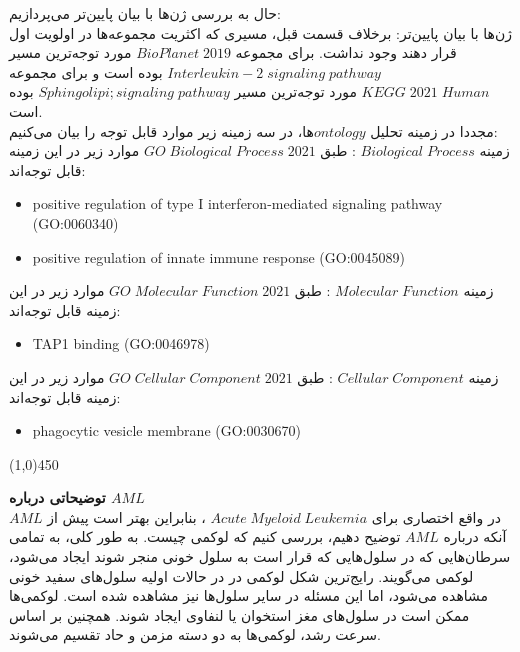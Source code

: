 \documentclass[a4paper,12pt]{article}
\begin{document}
حال به بررسی ژن‌ها با بیان پایین‌تر می‌پردازیم:\\
ژن‌ها با بیان پایین‌تر: برخلاف قسمت قبل، مسیری که اکثریت مجموعه‌ها در اولویت اول قرار دهند وجود نداشت. برای مجموعه
$BioPlanet\; 2019$
مورد توجه‌ترین مسیر
$Interleukin-2\; signaling\; pathway$
بوده است و برای مجموعه
$KEGG\; 2021\; Human$
مورد توجه‌ترین مسیر
$Sphingolipi; signaling\; pathway$
بوده است.
\\
مجددا در زمینه تحلیل $ontology$ها، در سه زمینه زیر موارد قابل توجه را بیان می‌کنیم:\\
زمینه
$Biological\; Process$ : 
طبق
$GO\; Biological\; Process\; 2021$
موارد زیر در این زمینه قابل توجه‌اند:
\begin{latin}
\begin{itemize}
\item positive regulation of type I interferon-mediated signaling pathway (GO:0060340)
\item positive regulation of innate immune response (GO:0045089)
\end{itemize}
\end{latin}
زمینه
$Molecular\; Function$ : 
طبق
$GO\; Molecular\; Function\; 2021$
موارد زیر در این زمینه قابل توجه‌اند:
\begin{latin}
\begin{itemize}
\item TAP1 binding (GO:0046978)
\end{itemize}
\end{latin}
زمینه
$Cellular\; Component$ : 
طبق
$GO\; Cellular\; Component\; 2021$
موارد زیر در این زمینه قابل توجه‌اند:
\begin{latin}
\begin{itemize}
\item phagocytic vesicle membrane (GO:0030670)
\end{itemize}
\end{latin}
\begin{center}
\line(1,0){450}
\end{center}
\textbf{توضیحاتی درباره $AML$}\\
$AML$
در واقع اختصاری برای
$Acute\; Myeloid\; Leukemia$
،
بنابراین بهتر است پیش از آنکه درباره $AML$ توضیح دهیم، بررسی کنیم که لوکمی چیست. به طور کلی، به تمامی سرطان‌هایی که در سلول‌هایی که قرار است به سلول خونی منجر شوند ایجاد می‌شود، لوکمی می‌گویند. رایج‌ترین شکل لوکمی در در حالات اولیه سلول‌های سفید خونی مشاهده می‌شود، اما این مسئله در سایر سلول‌ها نیز مشاهده شده است. لوکمی‌ها ممکن است در سلول‌‌های مغز استخوان یا لنفاوی ایجاد شوند. همچنین بر اساس سرعت رشد، لوکمی‌ها به دو دسته مزمن و حاد تقسیم می‌شوند.\\
\end{document}

